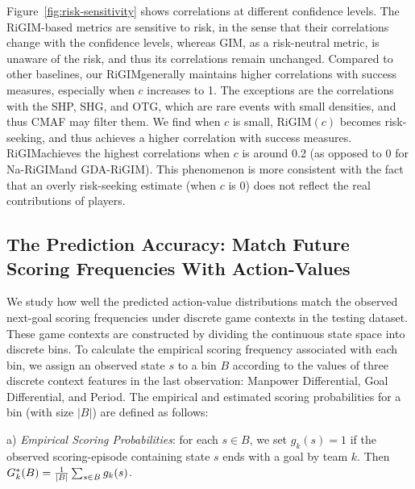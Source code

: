 \documentclass{article}
\newcommand{\state}{s}
\newcommand{\agentIndex}{k}
\newcommand{\confidence}{c}
\newcommand{\sys}{RiGIM}
\newcommand{\bin}{B}
\newcommand{\goal}{g}
\newcommand{\system}{\sys\;}
\begin{document}
Figure~\ref{fig:risk-sensitivity} shows correlations at different confidence levels. The \sys-based metrics are sensitive to risk, in the sense that their correlations change with the confidence levels, whereas GIM, as a risk-neutral metric, is unaware of the risk, and thus its correlations remain unchanged. 
Compared to other baselines, our \system generally maintains higher correlations with success measures, especially when $\confidence$ increases to 1. The exceptions are the correlations with the SHP, SHG, and OTG, which are rare events with small densities, and thus CMAF may filter them. 
We find when $\confidence$ is small, \sys$(\confidence)$ becomes risk-seeking, and thus achieves a higher correlation with success measures.
\system achieves the highest correlations when $\confidence$ is around 0.2 (as opposed to 0 for Na-\system and GDA-\system). This phenomenon is more consistent with the fact that an overly risk-seeking estimate (when $\confidence$ is 0) does not reflect the real contributions of players.



\subsection{The Prediction Accuracy: Match Future Scoring Frequencies With Action-Values}
We study how well the predicted action-value distributions match the observed next-goal scoring frequencies under discrete game contexts in the testing dataset. 
These game contexts are constructed by dividing the continuous state space into discrete bins. To calculate the empirical scoring frequency associated with each bin, we assign an observed state $\state$ to a bin $\bin$ according to the values of three discrete context features in the last observation: Manpower Differential, Goal Differential, and Period. The empirical and estimated scoring probabilities for a bin (with size $|\bin|$) are defined as follows:

a){ \it Empirical Scoring Probabilities}: for each $\state\in\bin$, we set $\goal_{\agentIndex}{(\state)} = 1$ if the observed scoring-episode containing state $\state$ ends with a goal by team $\agentIndex$. Then $\MakeUppercase{\goal}^{*}_{\agentIndex}(\bin) = \frac{1}{|\bin|}\sum_{\state \in \bin} \goal_{\agentIndex}(\state)$.
\end{document}
